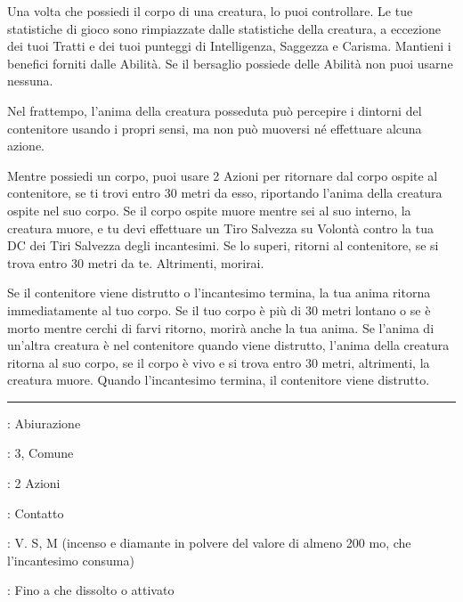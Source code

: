\begin{multicols}{2}
Una volta che possiedi il corpo di una creatura, lo puoi controllare. Le tue statistiche di gioco sono rimpiazzate dalle statistiche della creatura, a eccezione dei tuoi Tratti e dei tuoi punteggi di Intelligenza, Saggezza e Carisma. Mantieni i benefici forniti dalle Abilità. Se il bersaglio possiede delle Abilità non puoi usarne nessuna.

Nel frattempo, l'anima della creatura posseduta può percepire i dintorni del contenitore usando i propri sensi, ma non può muoversi né effettuare alcuna azione.

Mentre possiedi un corpo, puoi usare 2 Azioni per ritornare dal corpo ospite al contenitore, se ti trovi entro 30 metri da esso, riportando l'anima della creatura ospite nel suo corpo. Se il corpo ospite muore mentre sei al suo interno, la creatura muore, e tu devi effettuare un Tiro Salvezza su Volontà contro la tua DC dei Tiri Salvezza degli incantesimi. Se lo superi, ritorni al contenitore, se si trova entro 30 metri da te. Altrimenti, morirai.

Se il contenitore viene distrutto o l'incantesimo termina, la tua anima ritorna immediatamente al tuo corpo. Se il tuo corpo è più di 30 metri lontano o se è morto mentre cerchi di farvi ritorno, morirà anche la tua anima. Se l'anima di un'altra creatura è nel contenitore quando viene distrutto, l'anima della creatura ritorna al suo corpo, se il corpo è vivo e si trova entro 30 metri, altrimenti, la creatura muore. Quando l'incantesimo termina, il contenitore viene distrutto.

\smallskip\noindent\rule{\linewidth}{2pt} \hypertarget{Glifo di Interdizione}{}\medskip{}
\noindent
\begin{description}[noitemsep, topsep=0pt, parsep=0pt, partopsep=0pt, leftmargin=0cm, labelwidth=2.8cm]
	\item[\textbf{Lista di Magia}]: Abiurazione
	\item[\textbf{Livello}]: 3, Comune
	\item[\textbf{T. di Lancio}]: 2 Azioni
	\item[\textbf{Gittata}]: Contatto
	\item[\textbf{Componenti}]: V. S, M (incenso e diamante in polvere del valore di almeno 200 mo, che l'incantesimo consuma)
	\item[\textbf{Durata}]: Fino a che dissolto o attivato
\end{description}


\end{multicols}
